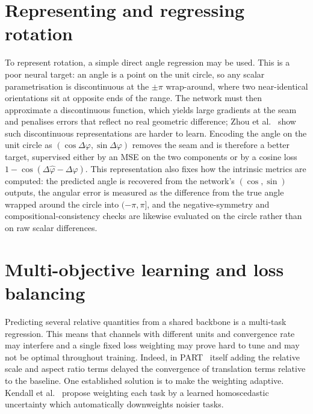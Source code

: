 \documentclass[11pt,a4paper]{report}
\begin{document}
\section{Representing and regressing rotation}
To represent rotation, a simple direct angle regression may be used. This is a poor neural target: an angle is a point on the unit circle, so any scalar parametrisation is discontinuous at the $\pm\pi$ wrap-around, where two near-identical orientations sit at opposite ends of the range. The network must then approximate a discontinuous function, which yields large gradients at the seam and penalises errors that reflect no real geometric difference; Zhou et al.~\cite{rotcont} show such discontinuous representations are harder to learn. Encoding the angle on the unit circle as $(\cos\Delta\varphi,\sin\Delta\varphi)$ removes the seam and is therefore a better target, supervised either by an MSE on the two components or by a cosine loss $1-\cos(\Delta\hat\varphi-\Delta\varphi)$. This representation also fixes how the intrinsic metrics are computed: the predicted angle is recovered from the network's $(\cos,\sin)$ outputs, the angular error is measured as the difference from the true angle wrapped around the circle into $(-\pi,\pi]$, and the negative-symmetry and compositional-consistency checks are likewise evaluated on the circle rather than on raw scalar differences.


\section{Multi-objective learning and loss balancing}
Predicting several relative quantities from a shared backbone is a multi-task regression. This means that channels with different units and convergence rate may interfere and a single fixed loss weighting may prove hard to tune and may not be optimal throughout training. Indeed, in PART~\cite{part} itself adding the relative scale and aspect ratio terms delayed the convergence of translation terms relative to the baseline. One established solution is to make the weighting adaptive. Kendall et al.~\cite{kendall} propose weighting each task by a learned homoscedastic uncertainty which automatically downweights noisier tasks.
\end{document}
